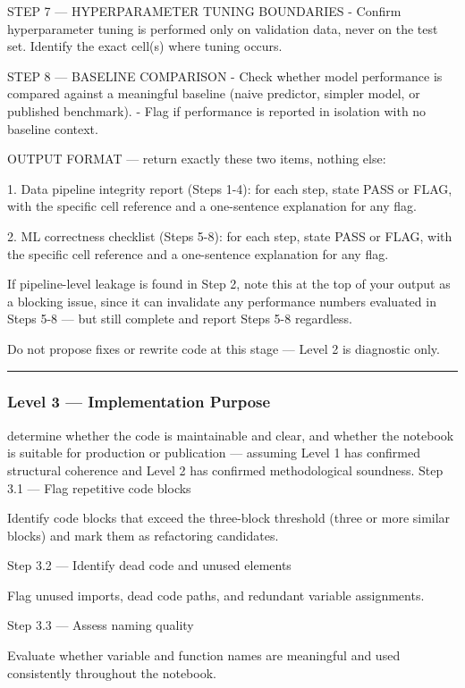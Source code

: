 \documentclass[11pt, a4paper]{article}
\begin{document}
{STEP 7 — HYPERPARAMETER TUNING BOUNDARIES
- Confirm hyperparameter tuning is performed only on validation data,
never on the test set. Identify the exact cell(s) where tuning occurs.

STEP 8 — BASELINE COMPARISON
- Check whether model performance is compared against a meaningful
baseline (naive predictor, simpler model, or published benchmark).
- Flag if performance is reported in isolation with no baseline context.

OUTPUT FORMAT — return exactly these two items, nothing else:

1. Data pipeline integrity report (Steps 1-4): for each step, state
PASS or FLAG, with the specific cell reference and a one-sentence
explanation for any flag.

2. ML correctness checklist (Steps 5-8): for each step, state PASS or
FLAG, with the specific cell reference and a one-sentence explanation
for any flag.

If pipeline-level leakage is found in Step 2, note this at the top of
your output as a blocking issue, since it can invalidate any performance
numbers evaluated in Steps 5-8 — but still complete and report Steps 5-8
regardless.

Do not propose fixes or rewrite code at this stage — Level 2 is
diagnostic only.

}

\rule{\textwidth}{0.3pt}

\vspace{.3cm}


\subsubsection*{Level 3 — Implementation
Purpose} 
determine whether the code is maintainable and clear, and whether the notebook is suitable for production or publication — assuming Level 1 has confirmed structural coherence and Level 2 has confirmed methodological soundness.
Step 3.1 — Flag repetitive code blocks

Identify code blocks that exceed the three-block threshold (three or more similar blocks) and mark them as refactoring candidates.

Step 3.2 — Identify dead code and unused elements

Flag unused imports, dead code paths, and redundant variable assignments.

Step 3.3 — Assess naming quality

Evaluate whether variable and function names are meaningful and used consistently throughout the notebook.
\end{document}
